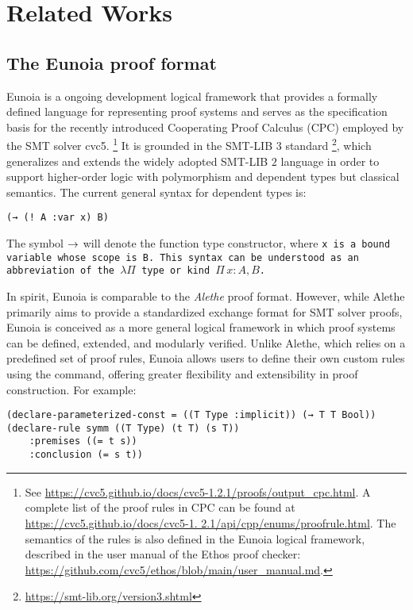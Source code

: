 \chapter{Related Works}\label{ch:relatedworks}

\section{The Eunoia proof format}
Eunoia is a ongoing development logical framework that provides a formally defined language for representing proof systems and serves as the specification basis for the recently introduced Cooperating Proof Calculus (CPC) employed by the SMT solver cvc5.
%
\footnote{See \url{https://cvc5.github.io/docs/cvc5-1.2.1/proofs/output_cpc.html}. A complete
list of the proof rules in CPC can be found at \url{https://cvc5.github.io/docs/cvc5-1.
2.1/api/cpp/enums/proofrule.html}. The semantics of the rules is also defined in the
Eunoia logical framework, described in the user manual of the Ethos proof checker:
\url{https://github.com/cvc5/ethos/blob/main/user_manual.md}.}
%
It is grounded in the SMT-LIB $3$  standard \footnote{\url{https://smt-lib.org/version3.shtml}}, which generalizes and extends the widely adopted SMT-LIB $2$ language in order to support higher-order logic with polymorphism and dependent types but classical semantics.
The current general syntax for dependent types is:
\begin{lstlisting}[language=Eunoia,numbers=none]
(→ (! A :var x) B) 
\end{lstlisting}
The symbol $\rightarrow$ will denote the function type constructor, where \tt{x} is a bound variable whose scope is \tt{B}. This syntax can be understood as an abbreviation of the $\lambda\Pi$ type or kind $\Pi\,x:A, B$.

In spirit, Eunoia is comparable to the \emph{Alethe} proof format.
However, while Alethe primarily aims to provide a standardized exchange format for SMT solver proofs, Eunoia is conceived as a more general logical framework in which proof systems can be defined, extended, and modularly verified.
Unlike Alethe, which relies on a predefined set of proof rules, Eunoia allows users to define their own custom rules using the  command, offering greater flexibility and extensibility in proof construction.
For example:

\begin{lstlisting}[language=Eunoia, numbers=none]
(declare-parameterized-const = ((T Type :implicit)) (→ T T Bool))
(declare-rule symm ((T Type) (t T) (s T))
    :premises ((= t s))
    :conclusion (= s t))
\end{lstlisting}

